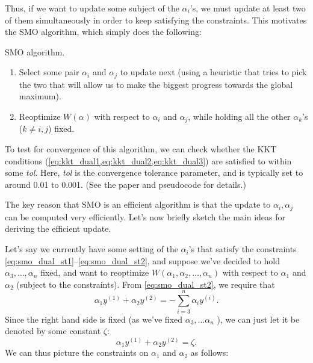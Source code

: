 Thus, if we want to update some subject of the $\alpha_i$'s, we must update at
least two of them simultaneously in order to keep satisfying the constraints.
This motivates the SMO algorithm, which simply does the following:
\begin{algorithm}[ht]
    \caption{SMO algorithm.}
    \label{alg:smo}
    \begin{algorithmic}
    \Repeat
        \begin{enumerate}
            \item Select some pair $\alpha_i$ and $\alpha_j$ to update next (using a heuristic that tries to pick the two that will allow us to make the biggest progress towards the global maximum).
            \item Reoptimize $W(\alpha)$ with respect to $\alpha_i$ and $\alpha_j$, while holding all the other $\alpha_k$'s ($k \ne i,j$) fixed.
        \end{enumerate}
    \end{algorithmic}
\end{algorithm}

To test for convergence of this algorithm, we can check whether the KKT
conditions (\cref{eq:kkt_dual1,eq:kkt_dual2,eq:kkt_dual3}) are satisfied to within some \textit{tol}. Here, \textit{tol} is
the convergence tolerance parameter, and is typically set to around 0.01 to
0.001. (See the paper and pseudocode for details.)

The key reason that SMO is an efficient algorithm is that the update to
$\alpha_i , \alpha_j$ can be computed very efficiently. Let's now briefly sketch the main
ideas for deriving the efficient update.

Let's say we currently have some setting of the $\alpha_i$'s that satisfy the constraints \ref{eq:smo_dual_st1}--\ref{eq:smo_dual_st2}, and suppose we've decided to hold $\alpha_3 ,\ldots,\alpha_n$ fixed, and
want to reoptimize $W(\alpha_1 ,\alpha_2 ,\ldots,\alpha_n )$ with respect to $\alpha_1$ and $\alpha_2$ (subject to
the constraints). From \cref{eq:smo_dual_st2}, we require that
\begin{equation*}
    \alpha_1 y^{(1)} + \alpha_2 y^{(2)} = -\sum_{i=3}^n \alpha_i y^{(i)}.
\end{equation*}
Since the right hand side is fixed (as we've fixed $\alpha_3 ,\ldots\alpha_n$ ), we can just let
it be denoted by some constant $\zeta$:
\begin{equation*}
    \alpha_1 y^{(1)} + \alpha_2 y^{(2)} = \zeta\label{eq:alpha_zeta}.
\end{equation*}
We can thus picture the constraints on $\alpha_1$ and $\alpha_2$ as follows:

